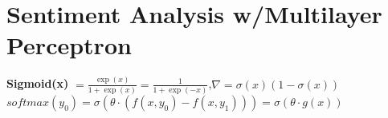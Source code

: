 \begin{comment}
	\pagebreak
\end{comment}

\section{Sentiment Analysis w/Multilayer Perceptron}
\begin{comment}
\subsection{Structure}

	\begin{itemize}
	\item Multi-layer Perceptrons
	\begin{itemize}
	\item Log-Linear Model Binary Classification
	\item Linear Separability
	\item Non-Linear Feature Functions
	\item MLPs
	\item XOR Problem
	\end{itemize}
	
	\item Feature Engineering and Word Embeddings
	\begin{itemize}
	\item Encoding Word
	\item Pooling and n-grams
	\item Word Embeddings
	\item Unsupervised Word Repr
	\item Skip-Gram
	\item BERT
	\end{itemize}
	
	\item Sentiment Analysis
	\begin{itemize}
	\item What is it?
	\item Why is it difficult?
	\item How to build it?
	\end{itemize}
	
	\end{itemize}
\end{comment}

\textbf{Sigmoid(x)} $= \frac{\exp(x)}{1 + \exp(x)} = \frac{1}{1 + \exp(-x)}$,$\nabla = \sigma(x)(1 - \sigma(x))$\\
$softmax(y_0) = \sigma(\theta \cdot (f(x,y_0) - f(x,y_1))) = \sigma(\theta \cdot g(x))$\\
\begin{comment}
	The Sigmoid is a special case of the softmax for binary classification.
	Can be derived from the softmax function.\\
\end{comment} 

